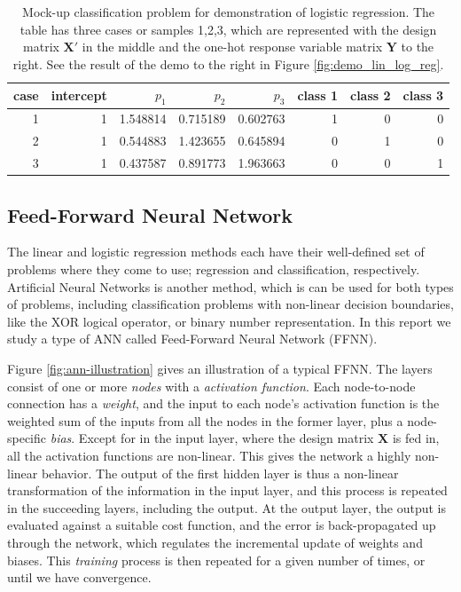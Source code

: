 \documentclass[]{article}
\begin{document}
\begin{table}[!ht]
	\caption{Mock-up classification problem for demonstration of logistic regression. The table has three cases or samples 1,2,3, which are represented with the design matrix $\mathbf{X}'$ in the middle and the one-hot response variable matrix $\mathbf{Y}$ to the right. See the result of the demo to the right in Figure \ref{fig:demo_lin_log_reg}.}
	\label{tab:logreg-demo}
	\begin{center}
		\begin{tabular}{r|rrrr|rrr}
			\toprule
			case &  intercept &     $p_1$ &     $p_2$ &     $p_3$ &  class 1 &  class 2 &  class 3 \\
			\midrule
			1 &          1 &  1.548814 &  0.715189 &  0.602763 &        1 &        0 &        0 \\
			2 &          1 &  0.544883 &  1.423655 &  0.645894 &        0 &        1 &        0 \\
			3 &          1 &  0.437587 &  0.891773 &  1.963663 &        0 &        0 &        1 \\
			\bottomrule
		\end{tabular}
	\end{center}
\end{table}


\subsection{Feed-Forward Neural Network}
The linear and logistic regression methods each have their well-defined set of problems where they come to use; regression and classification, respectively. Artificial Neural Networks is another method, which is can be used for both types of problems, including classification problems with non-linear decision boundaries, like the XOR logical operator, or binary number representation. In this report we study a type of ANN called Feed-Forward Neural Network (FFNN).

Figure \ref{fig:ann-illustration} gives an illustration of a typical FFNN. The layers consist of one or more \textit{nodes} with a \textit{activation function}. Each node-to-node connection has a \textit{weight}, and the input to each node's activation function is the weighted sum of the inputs from all the nodes in the former layer, plus a node-specific \textit{bias}. Except for in the input layer, where the design matrix $\mathbf{X}$ is fed in, all the activation functions are non-linear. This gives the network a highly non-linear behavior. The output of the first hidden layer is thus a non-linear transformation of the information in the input layer, and this process is repeated in the succeeding layers, including the output. At the output layer, the output is evaluated against a suitable cost function, and the error is back-propagated up through the network, which regulates the incremental update of weights and biases. This \textit{training} process is then repeated for a given number of times, or until we have convergence.
\end{document}
